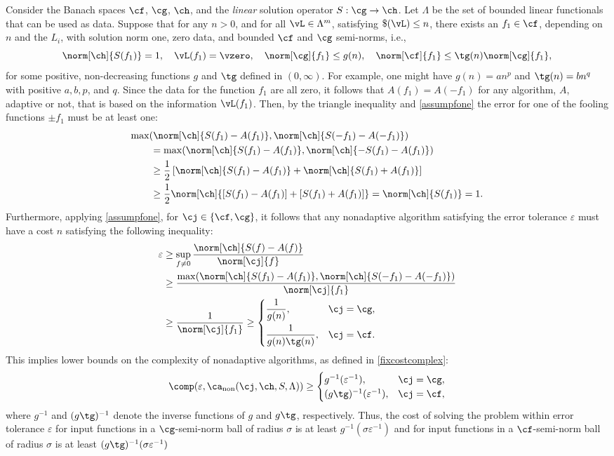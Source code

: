 \documentclass[]{elsarticle}
\DeclareMathOperator{\fix}{non}
\theoremstyle{definition}
\theoremstyle{remark}
\begin{document}
Consider the Banach spaces $\cf$, $\cg$, $\ch$, and the \emph{linear} solution operator $S: \cg \to \ch$.  Let $\Lambda$ be the set of bounded linear functionals that can be used as data. Suppose that for any $n>0$, and for all $\vL \in \Lambda^m$, satisfying $\$(\vL)\le n$, there exists an $f_1 \in \cf$, depending on $n$ and the $L_i$, with solution norm one, zero data, and bounded $\cf$ and $\cg$ semi-norms, i.e.,
\begin{equation} \label{assumpfone}
\norm[\ch]{S(f_1)} = 1, \quad \vL(f_1)= \vzero, \quad
\norm[\cg]{f_1} \le g(n), \quad \norm[\cf]{f_1} \le \tg(n) \norm[\cg]{f_1}, 
\end{equation}
for some positive, non-decreasing functions $g$ and $\tg$ defined in $(0,\infty)$.  For example, one might have $g(n)=an^p$ and $\tg(n)=bn^q$ with positive $a, b, p$, and $q$.  Since the data for the function $f_1$ are all zero, it follows that $A(f_1)=A(-f_1)$ for any algorithm, $A$, adaptive or not, that is based on the information $\vL(f_1)$.  Then, by the triangle inequality and \eqref{assumpfone} the error for one of the fooling functions $\pm f_1$ must be at least one:
\begin{align*}
\MoveEqLeft{\max(\norm[\ch]{S(f_1)-A(f_1)},\norm[\ch]{S(-f_1)-A(-f_1)})} \\
& = \max(\norm[\ch]{S(f_1)-A(f_1)},\norm[\ch]{-S(f_1)-A(f_1)})\\
& \ge \frac{1}{2} \left[ \norm[\ch]{S(f_1)-A(f_1)}+ \norm[\ch]{S(f_1)+A(f_1)} \right] \\
& \ge \frac{1}{2} \norm[\ch]{[S(f_1)-A(f_1)]+[S(f_1)+A(f_1)]} = \norm[\ch]{S(f_1)}=1.
\end{align*}
Furthermore, applying \eqref{assumpfone}, for $\cj \in \{\cf,\cg\}$, it follows that any nonadaptive algorithm satisfying the error tolerance $\varepsilon$ must have a cost $n$ satisfying the following inequality:
\begin{align*}
\varepsilon & \ge \sup_{f \ne 0} \frac{\norm[\ch]{S(f)-A(f)}}{\norm[\cj]{f}} \\
& \ge \frac{\max(\norm[\ch]{S(f_1)-A(f_1)},\norm[\ch]{S(-f_1)-A(-f_1)})}{\norm[\cj]{f_1}} \\
& \ge \frac{1}{\norm[\cj]{f_1}} 
\ge \begin{cases} \displaystyle \frac{1}{g(n)}, & \cj=\cg,\\[2ex]
 \displaystyle  \frac{1}{g(n)\tg(n)}, & \cj=\cf.
\end{cases}
\end{align*}
This implies lower bounds on the complexity of nonadaptive algorithms, as defined in \eqref{fixcostcomplex}:
\[
\comp(\varepsilon,\ca_{\fix}(\cj,\ch,S,\Lambda)) \ge
\begin{cases} g^{-1}(\varepsilon^{-1}), & \cj=\cg,\\
(g\tg)^{-1}(\varepsilon^{-1}), & \cj=\cf,
\end{cases}
\]
where $g^{-1}$ and $(g\tg)^{-1}$ denote the inverse functions of $g$ and $g\tg$, respectively.
Thus, the cost of solving the problem within error tolerance $\varepsilon$ for input functions in a $\cg$-semi-norm ball of radius $\sigma$ is at least $g^{-1}(\sigma\varepsilon^{-1})$ and for input functions in a $\cf$-semi-norm ball of radius $\sigma$ is at least $(g\tg)^{-1}(\sigma\varepsilon^{-1})$
\end{document}
